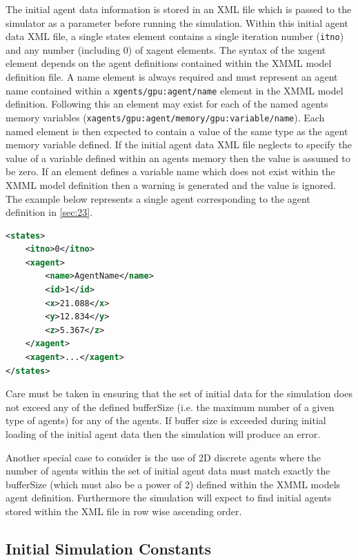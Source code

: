 \documentclass[11pt, a4paper, onecolumn, oneside]{report}
\begin{document}
The initial agent data information is stored in an XML file which is passed to the simulator as a parameter before running the simulation.
Within this initial agent data XML file, a single states element contains a single iteration number (\texttt{itno}) and any number (including 0) of xagent elements.
The syntax of the xagent element depends on the agent definitions contained within the XMML model definition file.
A name element is always required and must represent an agent name contained within a \texttt{xgents/gpu:agent/name} element in the XMML model definition.
Following this an element may exist for each of the named agents memory variables (\texttt{xagents/gpu:agent/memory/gpu:variable/name}).
Each named element is then expected to contain a value of the same type as the agent memory variable defined.
If the initial agent data XML file neglects to specify the value of a variable defined within an agents memory then the value is assumed to be zero.
If an element defines a variable name which does not exist within the XMML model definition then a warning is generated and the value is ignored.
The example below represents a single agent corresponding to the agent definition in \cref{sec:23}.

\begin{lstlisting}[language=XML]
<states>
    <itno>0</itno>
    <xagent>
        <name>AgentName</name>
        <id>1</id>
        <x>21.088</x>
        <y>12.834</y>
        <z>5.367</z>
    </xagent>
    <xagent>...</xagent>
</states>
\end{lstlisting}

Care must be taken in ensuring that the set of initial data for the simulation does not exceed any of the defined bufferSize (i.e. the maximum number of a given type of agents) for any of the agents.
If buffer size is exceeded during initial loading of the initial agent data then the simulation will produce an error.

Another special case to consider is the use of 2D discrete agents where the number of agents within the set of initial agent data must match exactly the bufferSize (which must also be a power of 2) defined within the XMML models agent definition.
Furthermore the simulation will expect to find initial agents stored within the XML file in row wise ascending order.

\subsection{Initial Simulation Constants}
\label{sec:271}
\end{document}
